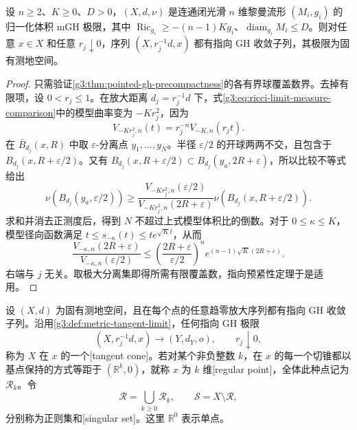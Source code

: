 \begin{proposition}\label{g3:prop:ricci-limit-tangents-exist}
	设 \(n\ge2\)、\(K\ge0\)、\(D>0\)，\((X,d,\nu)\) 是连通闭光滑 \(n\) 维黎曼流形 \((M_i,g_i)\) 的归一化体积 mGH 极限，其中 \(\operatorname{Ric}_{g_i}\ge-(n-1)Kg_i\)、\(\operatorname{diam}_{g_i}M_i\le D\)。则对任意 \(x\in X\) 和任意 \(r_j\downarrow0\)，序列 \((X,r_j^{-1}d,x)\) 都有指向 GH 收敛子列，其极限为固有测地空间。
\end{proposition}
\begin{proof}
	只需验证\cref{g3:thm:pointed-gh-precompactness}的各有界球覆盖数界。去掉有限项，设 \(0<r_j\le1\)。在放大距离 \(d_j=r_j^{-1}d\) 下，式\eqref{g3:eq:ricci-limit-measure-comparison}中的模型曲率变为 \(-Kr_j^2\)，因为
	\[
		V_{-Kr_j^2,n}(t)=r_j^{-n}V_{-K,n}(r_jt).
	\]
	在 \(\overline B_{d_j}(x,R)\) 中取 \(\varepsilon\)-分离点 \(y_1,\ldots,y_N\)。半径 \(\varepsilon/2\) 的开球两两不交，且包含于 \(B_{d_j}(x,R+\varepsilon/2)\)。又有
	\(B_{d_j}(x,R+\varepsilon/2)\subset B_{d_j}(y_a,2R+\varepsilon)\)，所以比较不等式给出
	\[
		\nu(B_{d_j}(y_a,\varepsilon/2))
		\ge\frac{V_{-Kr_j^2,n}(\varepsilon/2)}
		{V_{-Kr_j^2,n}(2R+\varepsilon)}
		\nu(B_{d_j}(x,R+\varepsilon/2)).
	\]
	求和并消去正测度后，得到 \(N\) 不超过上式模型体积比的倒数。对于 \(0\le\kappa\le K\)，模型径向函数满足
	\(t\le s_{-\kappa}(t)\le t e^{\sqrt Kt}\)，从而
	\[
		\frac{V_{-\kappa,n}(2R+\varepsilon)}
		{V_{-\kappa,n}(\varepsilon/2)}
		\le\left(\frac{2R+\varepsilon}{\varepsilon/2}\right)^n
		e^{(n-1)\sqrt K(2R+\varepsilon)}.
	\]
	右端与 \(j\) 无关。取极大分离集即得所需有限覆盖数，指向预紧性定理于是适用。
\end{proof}

\begin{definition}\label{g3:def:ricci-limit-regular-singular}
	设 \((X,d)\) 为固有测地空间，且在每个点的任意趋零放大序列都有指向 GH 收敛子列。沿用\cref{g3:def:metric-tangent-limit}，任何指向 GH 极限
	\[
		(X,r_j^{-1}d,x)\longrightarrow(Y,d_Y,o),\qquad r_j\downarrow0,
	\]
	称为 \(X\) 在 \(x\) 的一个[tangent cone]。若对某个非负整数 \(k\)，在 \(x\) 的每一个切锥都以基点保持的方式等距于 \((\mathbb R^k,0)\)，就称 \(x\) 为 \(k\) 维[regular point]，全体此种点记为 \(\mathcal R_k\)。令
	\[
		\mathcal R=\bigcup_{k\ge0}\mathcal R_k,
		\qquad \mathcal S=X\setminus\mathcal R,
	\]
	分别称为正则集和[singular set]。这里 \(\mathbb R^0\) 表示单点。
\end{definition}

